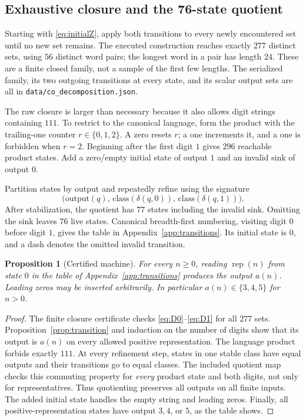 \documentclass[11pt,a4paper]{article}
\newtheorem{proposition}[theorem]{Proposition}
\theoremstyle{definition}
\theoremstyle{remark}
\newcommand{\rep}{\operatorname{rep}}
\newcommand{\code}[1]{\texttt{#1}}
\begin{document}
\subsection{Exhaustive closure and the 76-state quotient}
Starting with \eqref{eq:initialZ}, apply both transitions to every newly
encountered set until no new set remains. The executed construction reaches
exactly $277$ distinct sets, using $56$ distinct word pairs; the longest
word in a pair has length $24$. These are a finite closed family, not a
sample of the first few lengths. The serialized family, its two outgoing
transitions at every state, and its scalar output sets are all in
\code{data/co\_decomposition.json}.

The raw closure is larger than necessary because it also allows digit
strings containing $111$. To restrict to the canonical language, form the
product with the trailing-one counter $r\in\{0,1,2\}$. A zero resets $r$;
a one increments it, and a one is forbidden when $r=2$. Beginning after the
first digit $1$ gives $296$ reachable product states. Add a zero/empty
initial state of output $1$ and an invalid sink of output $0$.

Partition states by output and repeatedly refine using the signature
\[
 \bigl(\text{output}(q),\,
       \text{class}(\delta(q,0)),\,
       \text{class}(\delta(q,1))\bigr).
\]
After stabilization, the quotient has $77$ states including the invalid
sink. Omitting the sink leaves $76$ live states. Canonical breadth-first
numbering, visiting digit $0$ before digit $1$, gives the table in
Appendix~\ref{app:transitions}. Its initial state is $0$, and a dash denotes
the omitted invalid transition.

\begin{proposition}[Certified machine]\label{prop:machine}
For every $n\ge0$, reading $\rep(n)$ from state $0$ in the table of
Appendix~\ref{app:transitions} produces the output $a(n)$. Leading zeros
may be inserted arbitrarily. In particular $a(n)\in\{3,4,5\}$ for $n>0$.
\end{proposition}
\begin{proof}
The finite closure certificate checks \eqref{eq:D0}--\eqref{eq:D1} for all
$277$ sets. Proposition~\ref{prop:transition} and induction on the number of
digits show that its output is $a(n)$ on every allowed positive
representation. The language product forbids exactly $111$. At every
refinement step, states in one stable class have equal outputs and their
transitions go to equal classes. The included quotient map checks this
commuting property for \emph{every} product state and both digits, not only
for representatives. Thus quotienting preserves all outputs on all finite
inputs. The added initial state handles the empty string and leading
zeros. Finally, all positive-representation states have output $3,4$, or
$5$, as the table shows.
\end{proof}
\end{document}
